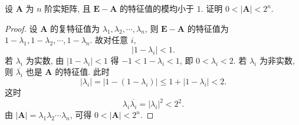 \documentclass[../../main.tex]{subfiles}%
\begin{document}
\begin{example}
设 $\boldsymbol{A}$ 为 $n$ 阶实矩阵, 且 $\boldsymbol{E} - \boldsymbol{A}$ 的特征值的模均小于 $1$. 证明 $0 < |\boldsymbol{A}| < 2^n$.
\end{example}
\begin{proof}

设 $\boldsymbol{A}$ 的复特征值为 $\lambda_1, \lambda_2, \cdots, \lambda_n$, 则 $\boldsymbol{E} - \boldsymbol{A}$ 的特征值为 $1 - \lambda_1, 1 - \lambda_2, \cdots, 1 - \lambda_n$. 故对任意 $i$,
\[
|1 - \lambda_i| < 1.
\]
若 $\lambda_i$ 为实数, 由 $|1 - \lambda_i| < 1$ 得 $-1 < 1 - \lambda_i < 1$, 即 $0 < \lambda_i < 2$.
若 $\lambda_i$ 为非实数, 则 $\overline{\lambda_i}$ 也是 $\boldsymbol{A}$ 的特征值. 此时
\[
|\lambda_i| = |1 - (1 - \lambda_i)| \leqslant 1 + |1 - \lambda_i| < 2.
\]
这时
\[
\lambda_i \overline{\lambda_i} = |\lambda_i|^2 < 2^2.
\]
由 $|\boldsymbol{A}| = \lambda_1 \lambda_2 \cdots \lambda_n$, 可得 $0 < |\boldsymbol{A}| < 2^n$.

\end{proof}
\end{document}
